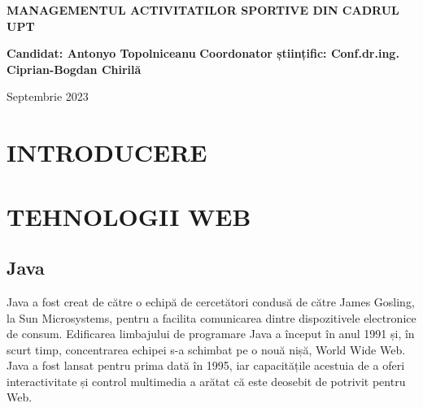 \documentclass[a4paper,12pt]{article}
\begin{document}
    \begin{titlepage}
    \vspace*{\fill}
    \begin{center}
        \huge{\textbf{\uppercase{Managementul activitatilor sportive din cadrul UPT}}}
    \end{center}
    \vfill
    \begin{flushleft}
        \Large{
            \textbf{Candidat: Antonyo Topolniceanu}
            \newline
            \newline
            \textbf{Coordonator științific: Conf.dr.ing. Ciprian-Bogdan Chirilă}
        }
        \newline
        \newline
    \end{flushleft}
    \begin{center}
        \Large{
            Septembrie 2023
        }
    \end{center}
    \end{titlepage}

    \tableofcontents

    \section*{\huge{}}

    \section{\Large\centering\uppercase{Introducere}}

    \section{\Large\centering\uppercase{Tehnologii web}}

    \subsection{Java}
    Java a fost creat de către o echipă de cercetători condusă de către James
    Gosling, la Sun Microsystems, pentru a facilita comunicarea dintre dispozitivele
    electronice de consum. Edificarea limbajului de programare Java a început în anul 1991 și,
    în scurt timp, concentrarea echipei s-a schimbat pe o nouă nișă, World Wide Web.
    Java a fost lansat pentru prima dată în 1995, iar capacitățile acestuia de a oferi
    interactivitate și control multimedia a arătat că este deosebit de potrivit pentru Web.
    
\end{document}

